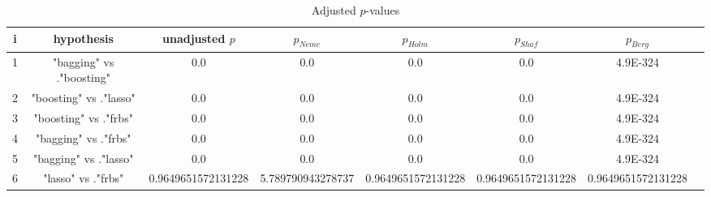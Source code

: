 \documentclass[a4paper,10pt]{article}
\begin{document}
\begin{landscape}
\begin{table}[!htp]
\centering\tiny
\caption{Adjusted $p$-values}
\begin{tabular}{cccccccc}
i&hypothesis&unadjusted $p$&$p_{Neme}$&$p_{Holm}$&$p_{Shaf}$&$p_{Berg}$\\
\hline
1&"bagging" vs ."boosting"&0.0&0.0&0.0&0.0&4.9E-324\\
2&"boosting" vs ."lasso"&0.0&0.0&0.0&0.0&4.9E-324\\
3&"boosting" vs ."frbs"&0.0&0.0&0.0&0.0&4.9E-324\\
4&"bagging" vs ."frbs"&0.0&0.0&0.0&0.0&4.9E-324\\
5&"bagging" vs ."lasso"&0.0&0.0&0.0&0.0&4.9E-324\\
6&"lasso" vs ."frbs"&0.9649651572131228&5.789790943278737&0.9649651572131228&0.9649651572131228&0.9649651572131228\\
\hline
\end{tabular}
\end{table}

\end{landscape}
\end{document}
